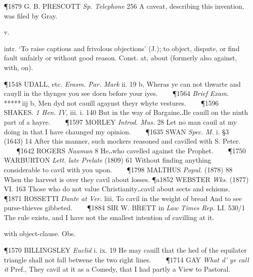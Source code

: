 \begin{description}[wide, labelwidth=!, labelindent=0pt]
\begin{myenumerate}
\P 1879 G. B. PRESCOTT  \textit{Sp. Telephone} 256 A caveat, describing this invention, was filed by Gray.
\end{myenumerate}

 v.

\noindent {}

\vspace{-0.3cm}

\begin{myenumerate}

 intr. ‘To raise captious and frivolous objections’ (J.); to object, dispute, or find fault unfairly or without good reason. Const. at, about (formerly also against, with, on).

\P 1548 UDALL, etc. \textit{Erasm. Par. Mark} ii. 19 b, Wheras ye can not thwarte and cauyll in the thynges you see doen before your iyes.    
\P 1564 \textit{Brief  Exam.} ***** iij b, Men dyd not cauill agaynst theyr whyte vestures.    
\P 1596 SHAKES.  \textit{1 Hen. IV}, iii. i. 140 But in the way of Bargaine‥Ile cauill on the ninth part of a hayre.    
\P 1597 MORLEY  \textit{Introd. Mus.} 28 Let no man cauil at my doing in that I have chaunged my opinion.    
\P 1635 SWAN  \textit{Spec. M.} i. §3 (1643) 14 After this manner, such mockers reasoned and cavilled with S. Peter.    
\P 1642 ROGERS  \textit{Naaman} 8 He‥who cavelled against the Prophet.    
\P 1750 WARBURTON  \textit{Lett. late Prelate} (1809) 61 Without finding anything considerable to cavil with you upon.    
\P 1798 MALTHUS  \textit{Popul.} (1878) 88 When the harvest is over they cavil about losses.
\P a1852 WEBSTER  \textit{Wks.} (1877) VI. 163 Those who do not value Christianity‥cavil about sects and schisms.    
\P 1871 ROSSETTI  \textit{Dante at Ver.} liii, To cavil in the weight of bread And to see purse-thieves gibbeted.    
\P 1884 SIR W. BRETT in \textit{Law Times Rep.} LI. 530/1 The rule exists, and I have not the smallest intention of cavilling at it.

 with object-clause. Obs.

\P 1570 BILLINGSLEY  \textit{Euclid} i. ix. 19 He may cauill that the hed of the equilater triangle shall not fall betwene the two right lines.    
\P 1714 GAY  \textit{What d' ye call it} Pref., They cavil at it as a Comedy, that I had partly a View to Pastoral.


\end{myenumerate}
\end{description}
